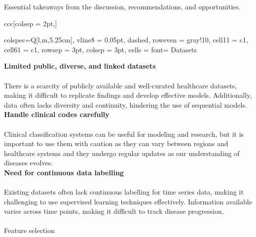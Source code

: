 \begin{table*}[h!]
    \centering
    \caption{Essential takeaways from the discussion, recommendations, and opportunities.}
    \begin{tblr}{ccc}[colsep = 2pt,]
        \begin{tblr}[T]{
            colspec={Q[l,m,5.25cm]},
            vline{8} = {0.05pt, dashed},
            row{even} = {gray!10},
            cell{1}{1} = {c1},
            cell{6}{1} = {c1},
            rowsep = 3pt,
            colsep = 3pt,
            cells = {font=\fontsize{7}{8}\linespread{1.00}\selectfont}
        }
           \toprule
            Datasets \\
           \midrule
        
           {\textbf{Limited public, diverse, and linked datasets} \\ \vspace{0.1cm} \\ 
           There is a scarcity of publicly available and well-curated healthcare datasets, making it difficult to replicate findings and develop effective models. Additionally, data often lacks diversity and continuity, hindering the use of sequential models.} \\
    
           {\textbf{Handle clinical codes carefully} \\ \vspace{0.1cm} \\ Clinical classification systems can be useful for modeling and research, but it is important to use them with caution as they can vary between regions and healthcare systems and they undergo regular updates as our understanding of diseases evolves.} \\
    
           {\textbf{Need for continuous data labelling} \\ \vspace{0.1cm} \\ Existing datasets often lack continuous labelling for time series data, making it challenging to use supervised learning techniques effectively. Information available varies across time points, making it difficult to track disease progression. } \\ \\

           \midrule
            Feature selection \\
           \midrule


\end{tblr}
\end{tblr}
\end{table*}

